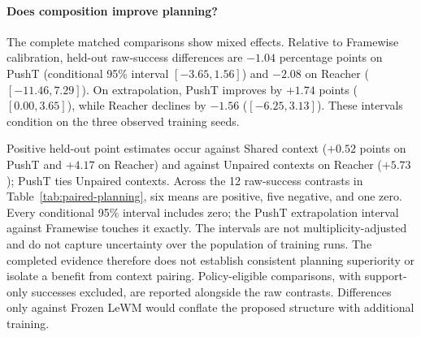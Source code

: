 \paragraph{Does composition improve planning?}
The complete matched comparisons show mixed effects. Relative to Framewise
calibration, held-out raw-success differences are $-1.04$ percentage points
on PushT (conditional 95\% interval $[-3.65,1.56]$) and $-2.08$ on Reacher
($[-11.46,7.29]$). On extrapolation, PushT improves by $+1.74$ points
($[0.00,3.65]$), while Reacher declines by $-1.56$ ($[-6.25,3.13]$).
These intervals condition on the three observed training seeds.

Positive held-out point estimates occur against Shared context ($+0.52$
points on PushT and $+4.17$ on Reacher) and against Unpaired contexts on
Reacher ($+5.73$); PushT ties Unpaired contexts. Across the 12 raw-success
contrasts in Table~\ref{tab:paired-planning}, six means are positive, five
negative, and one zero. Every conditional 95\% interval includes zero;
the PushT extrapolation interval against Framewise touches it exactly.
The intervals are not multiplicity-adjusted and do not capture uncertainty
over the population of training runs. The completed evidence therefore
does not establish consistent planning superiority or isolate a benefit
from context pairing. Policy-eligible comparisons, with support-only
successes excluded, are reported alongside the raw contrasts.
Differences only against Frozen LeWM would conflate the proposed structure
with additional training.

